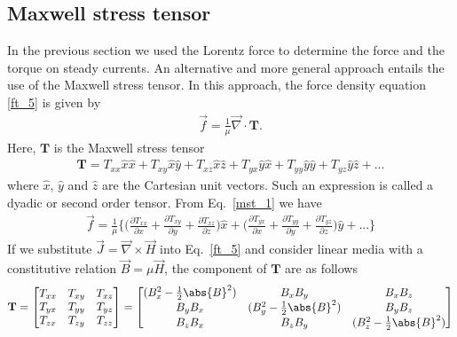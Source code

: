 \documentclass[12pt,a4paper,oneside]{book}
\begin{document}
\begin{onehalfspace}
\subsection{Maxwell stress tensor}
In the previous section we used the Lorentz force to determine the force and the torque on steady currents. An alternative and more general approach entails the use of the Maxwell stress tensor. In this approach, the force density equation \ref{ft_5} is given by
\begin{equation}\label{mst_1}
	\begin{aligned}
		\vec{f}=\frac{1}{\mu}\vec{\nabla}\cdot\mathbf{T}.
	\end{aligned}
\end{equation}
Here, $\mathbf{T}$ is the Maxwell stress tensor
\begin{equation}\label{mst_2}
	\begin{aligned}
		\mathbf{T}=T_{xx}\hat{x}\hat{x}+T_{xy}\hat{x}\hat{y}+T_{xz}\hat{x}\hat{z}+T_{yx}\hat{y}\hat{x}+T_{yy}\hat{y}\hat{y}+T_{yz}\hat{y}\hat{z}+...
	\end{aligned}
\end{equation}
where $\hat{x}$, $\hat{y}$ and $\hat{z}$ are the Cartesian unit vectors. Such an expression is called a dyadic or second order tensor. From Eq.~\eqref{mst_1} we have
\begin{equation}\label{mst_3}
	\begin{aligned}
		\vec{f}=\frac{1}{\mu}\Biggl\{\Bigg(\frac{\partial T_{xx}}{\partial x}+\frac{\partial T_{xy}}{\partial y}+\frac{\partial T_{xz}}{\partial z}\Bigg)\hat{x}+\Bigg(\frac{\partial T_{yx}}{\partial x}+\frac{\partial T_{yy}}{\partial y}+\frac{\partial T_{yz}}{\partial z}\Bigg)\hat{y}+... \Biggr\}
	\end{aligned}
\end{equation}
If we substitute $\vec{J}=\vec{\nabla}\times\vec{H}$ into Eq.~\eqref{ft_5} and consider linear media with a constitutive relation $\vec{B}=\mu\vec{H}$, the component of $\mathbf{T}$ are as follows
\begin{equation}\label{mst_4}
	\begin{aligned}
		\mathbf{T}=\begin{bmatrix} T_{xx} & T_{xy} & T_{xz} \\ T_{yx} & T_{yy} & T_{yz} \\ T_{zx} & T_{zy} & T_{zz}	\end{bmatrix}
	\end{aligned} = \begin{bmatrix} (B_x^2-\frac{1}{2}\abs{B}^2) & B_xB_y & B_xB_z \\ B_yB_x & (B_y^2-\frac{1}{2}\abs{B}^2) & B_yB_z \\ B_zB_x & B_zB_y &(B_z^2-\frac{1}{2}\abs{B}^2)	\end{bmatrix}

\end{equation}
\end{onehalfspace}
\end{document}
